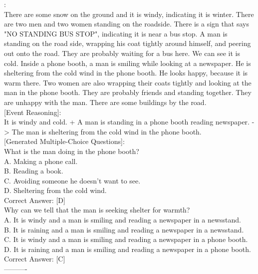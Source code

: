 \begin{figure*}
\begin{tcolorbox}
    [Description]:  \\
    There are some snow on the ground and it is windy, indicating it is winter. There are two men and two women standing on the roadside. There is a sign that says "NO STANDING BUS STOP", indicating it is near a bus stop. A man is standing on the road side, wrapping his coat tightly around himself, and peering out onto the road. They are probably waiting for a bus here. We can see it is cold. Inside a phone booth, a man is smiling while looking at a newspaper. He is sheltering from the cold wind in the phone booth. He looks happy, because it is warm there. Two women are also wrapping their coats tightly and looking at the man in the phone booth. They are probably friends and standing together. They are unhappy with the man. There are some buildings by the road. \\

    [Event Reasoning]:  \\ 
    It is windy and cold. + A man is standing in a phone booth reading newspaper. -> The man is sheltering from the cold wind in the phone booth. \\

    [Generated Multiple-Choice Questions]:  \\
    What is the man doing in the phone booth? \\
    A. Making a phone call. \\
    B. Reading a book. \\
    C. Avoiding someone he doesn't want to see. \\
    D. Sheltering from the cold wind. \\
    Correct Answer: [D] \\

    Why can we tell that the man is seeking shelter for warmth? \\
    A. It is windy and a man is smiling and reading a newspaper in a newsstand. \\
    B. It is raining and a man is smiling and reading a newspaper in a newsstand. \\
    C. It is windy and a man is smiling and reading a newspaper in a phone booth. \\
    D. It is raining and a man is smiling and reading a newspaper in a phone booth. \\
    Correct Answer: [C] \\
    ---------- \\


\end{tcolorbox}
\end{figure*}
